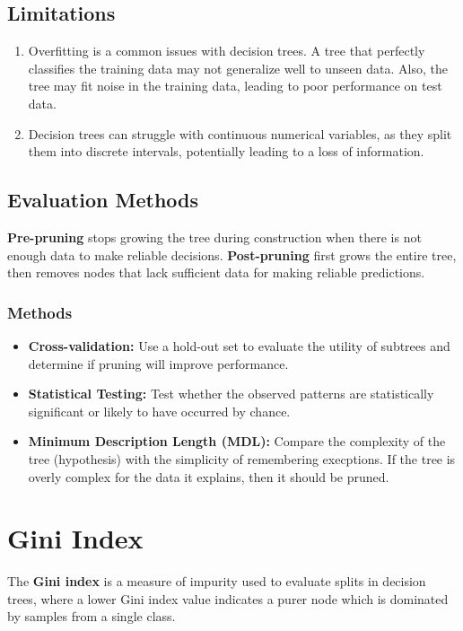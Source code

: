 \documentclass{article}
\begin{document}
\subsection*{Limitations}

\begin{enumerate}
    \item Overfitting is a common issues with decision trees. A tree that perfectly classifies the training data may not generalize well to unseen data. Also, the tree may fit noise in the training data, leading to poor performance on test data.
    \item Decision trees can struggle with continuous numerical variables, as they split them into discrete intervals, potentially leading to a loss of information.
\end{enumerate}

\subsection*{Evaluation Methods}

\textbf{Pre-pruning} stops growing the tree during construction when there is not enough data to make reliable decisions. \textbf{Post-pruning} first grows the entire tree, then removes nodes that lack sufficient data for making reliable predictions.

\subsubsection*{Methods}
\begin{itemize}
    \item \textbf{Cross-validation:} Use a hold-out set to evaluate the utility of subtrees and determine if pruning will improve performance.
    \item \textbf{Statistical Testing:} Test whether the observed patterns are statistically significant or likely to have occurred by chance.
    \item \textbf{Minimum Description Length (MDL):} Compare the complexity of the tree (hypothesis) with the simplicity of remembering execptions. If the tree is overly complex for the data it explains, then it should be pruned.
\end{itemize}

\section*{Gini Index}

The \textbf{Gini index} is a measure of impurity used to evaluate splits in decision trees, where a lower Gini index value indicates a purer node which is dominated by samples from a single class.
\end{document}
